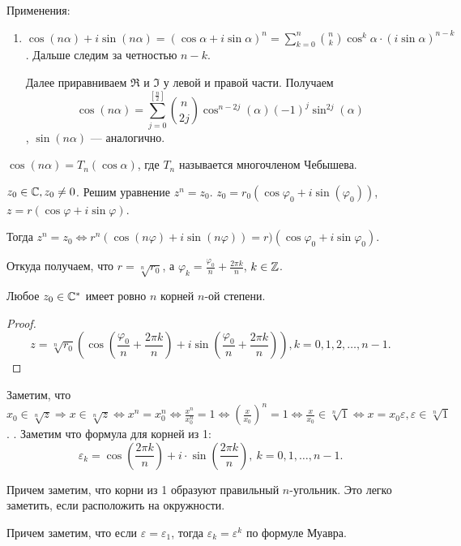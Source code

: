 \slashn
Применения:
\begin{enumerate}
    \item $\cos(n\alpha) + i\sin(n\alpha) = (\cos \alpha + i \sin \alpha)^n = \sum_{k=0}^n \binom{n}{k} \cos^k \alpha \cdot (i\sin\alpha)^{n-k}$. Дальше следим за четностью  $n-k$. 

        Далее приравниваем  $\Re$ и  $\Im$  у левой и правой части. Получаем  \[\cos(n\alpha) = \sum_{j=0}^{\left[\frac{n}{2}\right]} \binom{n}{2j} \cos^{n-2j}(\alpha)(-1)^j\sin^{2j}(\alpha)\], $\sin(n\alpha)$ --- аналогично. 

\end{enumerate}
\begin{definition}
    $\cos(n\alpha) = T_n(\cos \alpha)$, где $T_n$ называется многочленом Чебышева.
\end{definition}
$z_0 \in \mathbb{C}, z_0 \neq 0$. Решим уравнение  $z^n=z_0$.  $z_0 = r_0(\cos \varphi_0 + i \sin(\varphi_0))$, $z = r(\cos \varphi + i \sin \varphi)$.

Тогда  $z^n = z_0 \iff r^n(\cos(n \varphi) + i\sin(n \varphi)) = r)(\cos \varphi_0 + i \sin \varphi_0)$.

Откуда получаем, что  $r = \sqrt[n]{r_0}$, а  $\varphi_k = \frac{\varphi_0}{n} + \frac{2\pi k}{n}$, $k \in \mathbb{Z}$. 
 \begin{theorem}
     Любое $z_0 \in \mathbb{C}^*$ имеет ровно  $n$ корней $n$-ой степени.  
\end{theorem}
\begin{proof}
     \[
         z = \sqrt[n]{r_0}(\cos(\frac{\varphi_0}{n} + \frac{2\pi k}{n}) + i \sin (\frac{\varphi_0}{n}  + \frac{2\pi k}{n})), k = 0,1,2,\ldots,n-1
     .\] 
\end{proof}
\slashn
Заметим, что $x_0 \in \sqrt[n]{z} \Rightarrow x \in \sqrt[n]{z} \iff x^n = x_0^n \iff \frac{x^n}{x_0^n} = 1 \iff \left(\frac{x}{x_0}\right)^n = 1 \iff \frac{x}{x_0} \in \sqrt[n]{1} \iff x = x_0 \varepsilon, \varepsilon \in \sqrt[n]{1}$.
.
Заметим что формула для корней из 1: \[
    \varepsilon_k = \cos\left(\frac{2\pi k}{n}\right) + i \cdot \sin\left(\frac{2\pi k}{n}\right),\ k=0,1,\ldots,n-1
.\] 

Причем заметим, что корни из 1 образуют правильный $n$-угольник. Это легко заметить, если расположить на окружности.

Причем заметим, что если $\varepsilon = \varepsilon_1$, тогда $\varepsilon_k = \varepsilon^k$ по формуле Муавра.

